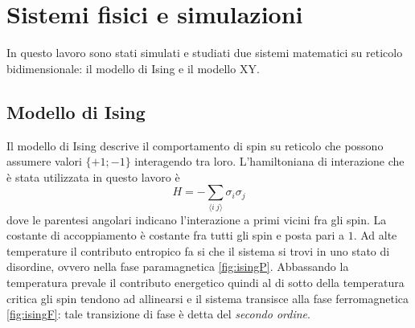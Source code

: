 \documentclass{article}
\begin{document}
\section{Sistemi fisici e simulazioni}
In questo lavoro sono stati simulati e studiati due sistemi matematici su reticolo bidimensionale:  il modello di Ising e il modello XY.
\subsection{Modello di Ising}
Il modello di Ising descrive il comportamento di spin su reticolo che possono assumere valori $\{+1;-1\}$ interagendo tra loro.
L'hamiltoniana di interazione che è stata utilizzata in questo lavoro è
\begin{equation}
H=- \sum_{\langle i~j\rangle} \sigma_i\sigma_j
\end{equation}
dove le parentesi angolari indicano l'interazione a primi vicini fra gli spin.
La costante di accoppiamento è costante fra tutti gli spin e posta pari a $1$.
Ad alte temperature il contributo entropico fa si che il sistema si trovi in uno stato di disordine, ovvero nella fase paramagnetica \ref{fig:isingP}.
Abbassando la temperatura prevale il contributo energetico quindi al di sotto della temperatura critica gli spin tendono ad allinearsi e il sistema transisce alla fase ferromagnetica \ref{fig:isingF}: tale transizione di fase è detta del \emph{secondo ordine}.
\end{document}
